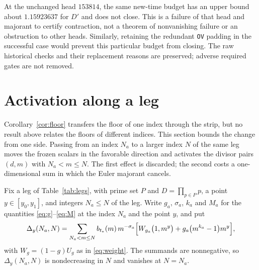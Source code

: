 \documentclass[11pt]{article}
\theoremstyle{remark}
\newcommand{\tstar}{t_*}
\numberwithin{equation}{section}
\begin{document}
At the unchanged head $153814$, the same new-time budget has an upper
bound about $1.15923637$ for $D'$ and does not close. This is a failure of
that head and majorant to certify contraction, not a theorem of
nonvanishing failure or an obstruction to other heads. Similarly, retaining
the redundant \texttt{OV} padding in the successful case would prevent
this particular budget from closing. The raw historical checks and their
replacement reasons are preserved; adverse required gates are not removed.

\section{Activation along a leg}\label{sec:activation}

Corollary~\ref{cor:floor} transfers the floor of one index through the
strip, but no result above relates the floors of different indices. This
section bounds the change from one side. Passing from an index $N_a$ to a
larger index $N$ of the same leg moves the frozen scalars in the favorable
direction and activates the divisor pairs $(d,m)$ with $N_a<m\le N$. The
first effect is discarded; the second costs a one-dimensional sum in which
the Euler majorant cancels.

Fix a leg of Table~\ref{tab:legs}, with prime set $P$ and
$D=\prod_{p\in P}p$, a point $y\in[y_0,y_1]$, and integers $N_a\le N$ of
the leg. Write $g_a$, $\sigma_a$, $k_a$ and $M_a$ for the quantities
\eqref{eq:g}--\eqref{eq:M} at the index $N_a$ and the point $y$, and put
\begin{equation}\label{eq:Delta}
 \Delta_y(N_a,N)=\sum_{N_a<m\le N}b_{\tstar}(m)\,m^{-\sigma_a}
 \Bigl[W_{g_a}\bigl(1,m^y\bigr)+g_a\bigl(m^{k_a}-1\bigr)m^{y}\Bigr],
\end{equation}
with $W_g=(1-g)U_g$ as in \eqref{eq:weight}. The summands are
nonnegative, so $\Delta_y(N_a,N)$ is nondecreasing in $N$ and vanishes at
$N=N_a$.
\end{document}
